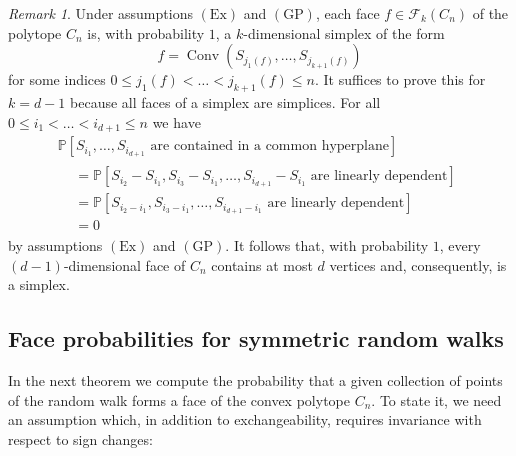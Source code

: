 \documentclass[12pt, reqno]{amsart}
\theoremstyle{plain}
\theoremstyle{definition}
\theoremstyle{remark}
\newtheorem{remark}[theorem]{Remark}
\begin{document}
\begin{remark}\label{rem:simplicial}
Under assumptions $(\text{Ex})$ and $(\text{GP})$, each face $f\in\mathcal F_k(C_n)$ of the polytope $C_n$ is, with probability $1$, a $k$-dimensional simplex of the form
$$
f = {\mathop{\mathrm{Conv}}\nolimits}(S_{j_1(f)},\ldots,S_{j_{k+1}(f)})
$$
for some indices $0\leq j_1(f)<\ldots<j_{k+1}(f)\leq n$. It suffices to prove this for $k=d-1$ because all faces of a simplex are simplices. For all $0\leq i_1<\ldots<i_{d+1}\leq n$ we have
\begin{multline*}
{\mathbb{P}}[S_{i_1},\ldots,S_{i_{d+1}} \text{ are contained in a common hyperplane}]
\\
\begin{aligned}
&=
{\mathbb{P}}[S_{i_2}-S_{i_1},S_{i_3}-S_{i_1},\ldots,S_{i_{d+1}}-S_{i_1} \text{ are linearly dependent}] \\
&=
{\mathbb{P}}[S_{i_2-i_1},S_{i_3-i_1}, \ldots,S_{i_{d+1}-i_1} \text{ are linearly dependent}] \\
&=
0
\end{aligned}
\end{multline*}
by assumptions $(\text{Ex})$ and $(\text{GP})$. It follows that, with probability $1$, every $(d-1)$-dimensional face of $C_n$ contains at most $d$ vertices and, consequently, is a simplex.
\end{remark}

\subsection{Face probabilities for symmetric random walks}
In the next theorem we compute the probability that a given collection of points of the random walk forms a face of the convex polytope $C_n$. To state it, we need an assumption which, in addition to exchangeability, requires invariance with respect to sign changes:
\end{document}
